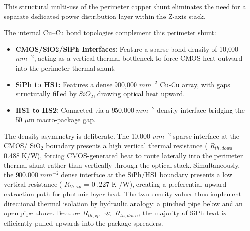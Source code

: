 \documentclass[journal]{IEEEtran}
\begin{document}
This structural multi-use of the perimeter copper shunt eliminates the need for a separate dedicated power distribution layer within the Z-axis stack.

The internal Cu--Cu bond topologies complement this perimeter shunt:

\begin{itemize}
\item  \textbf{CMOS/SiO2/SiPh Interfaces:} Feature a sparse bond density of 10,000 $mm^{-2}$, acting as a vertical thermal bottleneck to force CMOS heat outward into the perimeter thermal shunt.
\item  \textbf{SiPh to HS1:} Features a dense 900,000 $mm^{-2}$ Cu-Cu array, with gaps structurally filled by $SiO_2$, drawing optical heat upward.
\item  \textbf{HS1 to HS2:} Connected via a 950,000 $mm^{-2}$ density interface bridging the 50 $\mu$m macro-package gap.
\end{itemize}

The density asymmetry is deliberate. The 10,000 $mm^{-2}$ sparse interface at the CMOS/ SiO$_2$ boundary presents a high vertical thermal resistance ( $R_{th,down}$ = 0.488 K/W), forcing CMOS-generated heat to route laterally into the perimeter thermal shunt rather than vertically through the optical stack. Simultaneously, the 900,000 $mm^{-2}$ dense interface at the SiPh/HS1 boundary presents a low vertical resistance ( $R_{th,up}$ = 0 .227 K /W), creating a preferential upward extraction path for photonic layer heat. The two density values thus implement directional thermal isolation by hydraulic analogy: a pinched pipe below and an open pipe above. Because $R_{th,up}$ $\ll$ $R_{th,down}$, the majority of SiPh heat is efficiently pulled upwards into the package spreaders.
\end{document}
